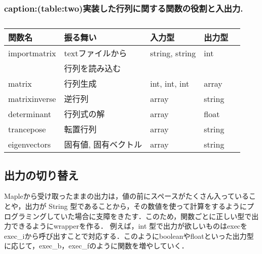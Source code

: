 \subsubsection{caption:(table:two)実装した行列に関する関数の役割と入出力.}
\begin{table}[htbp]\begin{center}
\caption{}
\begin{tabular}{lllll}
\hline
関数名  &振る舞い  &入力型  &出力型  \\ \hline
importmatrix  &textファイルから  &string, string  &int  \\
 &行列を読み込む  & \\
matrix  &行列生成  &int, int, int  &array  \\
matrixinverse  &逆行列  &array  &string  \\
determinant  &行列式の解  &array  &float  \\
trancepose  &転置行列  &array  &string  \\
eigenvectors  &固有値, 固有ベクトル  &array  &string  \\
\hline
\end{tabular}
\label{default}
\end{center}\end{table}

\newpage

\subsection{出力の切り替え}
Mapleから受け取ったままの出力は，値の前にスペースがたくさん入っていることや，出力が String 型であることから，その数値を使って計算をするようにプログラミングしていた場合に支障をきたす．このため，関数ごとに正しい型で出力できるようにwrapperを作る．
例えば，int 型で出力が欲しいものはexecをexec\_iから呼び出すことで対応する．このようにbooleanやfloatといった出力型に応じて，exec\_b，exec\_fのように関数を増やしていく．

